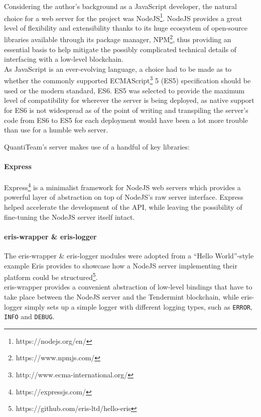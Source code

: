 \documentclass[12pt]{report}
\let\oldparagraph\paragraph
\renewcommand{\paragraph}[1]{\oldparagraph{#1}\mbox{}}
\begin{document}
Considering the author's background as a JavaScript developer, the
natural choice for a web server for the project was
NodeJS\footnote{https://nodejs.org/en/}. NodeJS provides a great
level of flexibility and extensibility thanks to its huge ecosystem of
open-source libraries available through its package manager,
NPM\footnote{https://www.npmjs.com/}, thus providing an essential
basis to help mitigate the possibly complicated technical details of
interfacing with a low-level blockchain.\\
As JavaScript is an ever-evolving language, a choice had to be made as
to whether the commonly supported
ECMAScript\footnote{http://www.ecma-international.org/} 5
(ES5) specification should be used or the modern standard, ES6. ES5 was
selected to provide the maximum level of compatibility for wherever the
server is being deployed, as native support for ES6 is not widespread as
of the point of writing and transpiling the server's code from ES6 to
ES5 for each deployment would have been a lot more trouble than use for
a humble web server.

QuantiTeam's server makes use of a handful of key libraries:

\paragraph{Express}\label{express}

Express\footnote{https://expressjs.com/} is a minimalist
framework for NodeJS web servers which provides a powerful layer of
abstraction on top of NodeJS's raw server interface. Express helped
accelerate the development of the API, while leaving the possibility of
fine-tuning the NodeJS server itself intact.

\paragraph{eris-wrapper \& eris-logger}\label{eris-wrapper-eris-logger}

The eris-wrapper \& eris-logger modules were adopted from a ``Hello
World''-style example Eris provides to showcase how a NodeJS server
implementing their platform could be
structured\footnote{https://github.com/eris-ltd/hello-eris}.\\
eris-wrapper provides a convenient abstraction of low-level bindings
that have to take place between the NodeJS server and the Tendermint
blockchain, while eris-logger simply sets up a simple logger with
different logging types, such as \texttt{ERROR}, \texttt{INFO} and
\texttt{DEBUG}.
\end{document}
